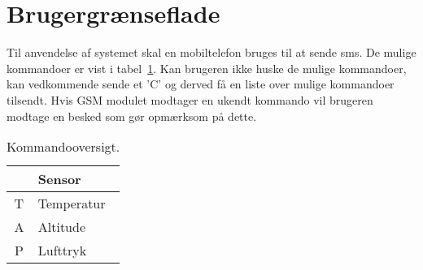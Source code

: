 \section{Brugergrænseflade}

Til anvendelse af systemet skal en mobiltelefon bruges til at sende sms. De mulige kommandoer er vist i tabel~\ref{tab:commands}. Kan brugeren ikke huske de mulige kommandoer, kan vedkommende sende et 'C' og derved få en liste over mulige kommandoer tilsendt. Hvis GSM modulet modtager en ukendt kommando vil brugeren modtage en besked som gør opmærksom på dette.

\vskip0.5cm

\begin{table}[h]
	\centering
	\begin{tabular}{|c|l|}
		\hline
		\rowcolor[HTML]{EFEFEF} 
		\multicolumn{1}{|l|}{\cellcolor[HTML]{EFEFEF}\textbf{SMS}} & \textbf{Sensor}	\\ 	\hline
		T & Temperatur	\\ 	\hline
		A & Altitude	\\ 	\hline
		P & Lufttryk	\\ 	\hline
	\end{tabular}
	\caption{Kommandooversigt.}
	\label{tab:commands}
\end{table}
